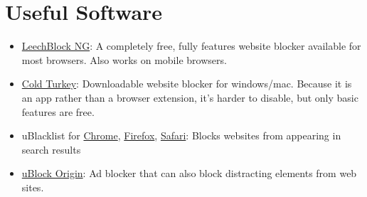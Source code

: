 \documentclass[
  openany]{book}
\providecommand{\tightlist}{%
  \setlength{\itemsep}{0pt}\setlength{\parskip}{0pt}}
\begin{document}
\chapter{Useful Software}\label{AP-soft}

\begin{itemize}
\tightlist
\item
  \href{https://www.proginosko.com/leechblock/}{LeechBlock NG}: A completely free, fully features website blocker available for most browsers. Also works on mobile browsers.
\item
  \href{https://getcoldturkey.com/}{Cold Turkey}: Downloadable website blocker for windows/mac. Because it is an app rather than a browser extension, it's harder to disable, but only basic features are free.
\item
  uBlacklist for \href{https://chromewebstore.google.com/detail/ublacklist/pncfbmialoiaghdehhbnbhkkgmjanfhe}{Chrome}, \href{https://addons.mozilla.org/en-US/firefox/addon/ublacklist/}{Firefox}, \href{https://apps.apple.com/us/app/ublacklist-for-safari/id1547912640}{Safari}: Blocks websites from appearing in search results
\item
  \href{https://ublockorigin.com/}{uBlock Origin}: Ad blocker that can also block distracting elements from web sites.
\end{itemize}
\end{document}
